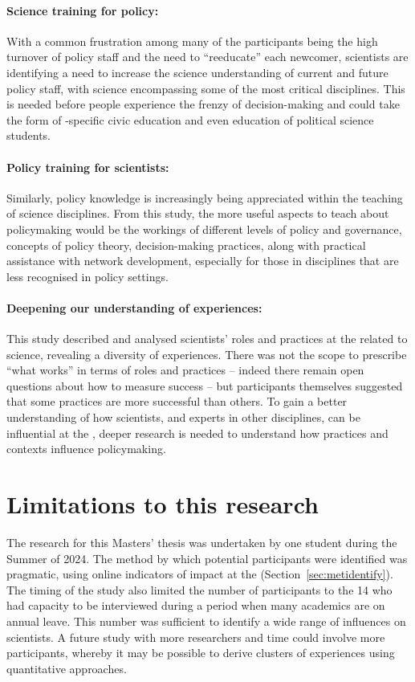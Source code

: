 \paragraph{Science training for policy:}
With a common frustration among many of the participants being the high turnover of policy staff and the need to ``reeducate'' each newcomer, scientists are identifying a need to increase the science understanding of current and future policy staff, with \CAN{} science encompassing some of the most critical disciplines. This is needed before people experience the frenzy of decision-making and could take the form of \CAN-specific civic education and even education of political science students.

\paragraph{Policy training for scientists:}
Similarly, policy knowledge is increasingly being appreciated within the teaching of science disciplines. From this study, the more useful aspects to teach about policymaking would be the workings of different levels of policy and governance, concepts of policy theory, decision-making practices, along with practical assistance with network development, especially for those in disciplines that are less recognised in policy settings. 

\paragraph{Deepening our understanding of experiences:}
This study described and analysed scientists' roles and practices at the \SPI{} related to \CAN{} science, revealing a diversity of experiences. There was not the scope to prescribe ``what works'' in terms of roles and practices -- indeed there remain open questions about how to measure success -- but participants themselves suggested that some practices are more successful than others. To gain a better understanding of how scientists, and experts in other disciplines, can be influential at the \SPI, deeper research is needed to understand how practices and contexts influence policymaking.

\section{Limitations to this research}
The research for this Masters' thesis was undertaken by one student during the Summer of 2024. The method by which potential participants were identified was pragmatic, using online indicators of impact at the \SPI{} (Section~\ref{sec:metidentify}). The timing of the study also limited the number of participants to the 14 who had capacity to be interviewed during a period when many academics are on annual leave. This number was sufficient to identify a wide range of influences on scientists. A future study with more researchers and time could involve more participants, whereby it may be possible to derive clusters of experiences using quantitative approaches.%


